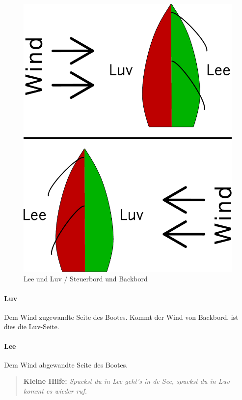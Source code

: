 \documentclass[12pt]{article}
\begin{document}
\begin{figure}[H]
\begin{center}
\includegraphics[scale=0.3]{bilder/lee-luv.pdf}
\end{center}
\caption{Lee und Luv / Steuerbord und Backbord}
\label{lee-luv}
\end{figure}

\paragraph{Luv}
Dem Wind zugewandte Seite des Bootes. Kommt der Wind von Backbord, ist dies die Luv-Seite.

\paragraph{Lee}
Dem Wind abgewandte Seite des Bootes.

\begin{quote}
\textbf{Kleine Hilfe:} \textit{Spuckst du in Lee geht's in de See, spuckst du in Luv kommt es wieder ruf.}
\end{quote}
\end{document}
